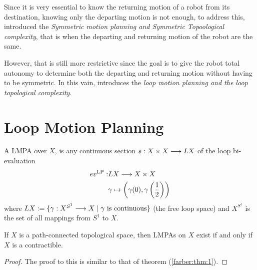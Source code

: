 Since it is very essential to know the returning motion of a robot from its destination, knowing only the departing motion is not enough, to address this, \cite{farber2007symmetric} introduced the \emph{Symmetric motion planning and Symmetric Topoological complexity}, that is when the departing and returning motion of the robot are the same.

However, that is still more restrictive since the goal is to give the robot total autonomy to determine both the departing and returning motion without having to be symmetric. 
In this vain, \cite{derfoufi2015loop} introduces the \emph{loop motion planning and the loop topological complexity}.



\section{Loop Motion Planning}
\begin{defn}
    A LMPA over $X$, is any continuous section $s: X \times X \longrightarrow LX$ of the loop bi-evaluation
    \begin{align*}
        ev^{\mathrm{LP}} : & LX \longrightarrow X \times X                                                  \\
                           & \gamma \mapsto \left(\gamma(0), \gamma \left(\frac12\right) \right)
    \end{align*}
    where $LX := \{\gamma : X ^{S^1} \longrightarrow X \mid \gamma \text{ is continuous}\}$ (the free loop space) and $X^{S^1}$ is the set of all mappings from $S^1$ to $X$.
\end{defn}

\begin{thm}\cite{derfoufi2015loop}
    If $X$ is a path-connected topological space, then LMPAs on $X$ exist if and only if $X$ is a contractible.
\end{thm}

\begin{proof}
    The proof to this is similar to that of theorem (\ref{farber:thm:1}).
\end{proof}

